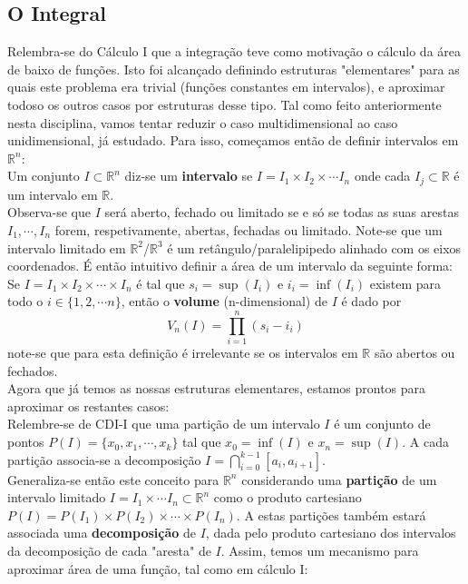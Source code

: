 \documentclass{article}
\newcommand{\R}{\mathbb{R}}
\begin{document}
\subsection{O Integral}
Relembra-se do Cálculo I que a integração teve como motivação o cálculo da área de baixo de funções. Isto foi alcançado definindo estruturas "elementares" para as quais este problema era trivial (funções constantes em intervalos), e aproximar todoso os outros casos por estruturas desse tipo. Tal como feito anteriormente nesta disciplina, vamos tentar reduzir o caso multidimensional ao caso unidimensional, já estudado. Para isso, começamos então de definir intervalos em $\R^n$:\\
Um conjunto $I \subset \R^n$ diz-se um \textbf{intervalo} se $I = I_1 \times I_2 \times \cdots I_n$ onde cada $I_j \subset \R$ é um intervalo em $\R$.\\
Observa-se que $I$ será aberto, fechado ou limitado se e só se todas as suas arestas $I_1, \cdots, I_n$ forem, respetivamente, abertas, fechadas ou limitado.
Note-se que um intervalo limitado em $\R^2$/$\R^3$ é um retângulo/paralelipipedo alinhado com os eixos coordenados. É então intuitivo definir a área de um intervalo da seguinte forma:\\
Se $I = I_1 \times I_2 \times \cdots \times I_n$ é tal que $s_i = \sup(I_i)$ e $i_i = \inf(I_i)$ existem para todo o $i \in \{1,2,\cdots n\}$, então o \textbf{volume} (n-dimensional) de $I$ é dado por
$$
V_n(I) = \prod_{i=1}^n (s_i-i_i)
$$
note-se que para esta definição é irrelevante se os intervalos em $\R$ são abertos ou fechados.\\
Agora que já temos as nossas estruturas elementares, estamos prontos para aproximar os restantes casos:\\
Relembre-se de CDI-I que uma partição de um intervalo $I$ é um conjunto de pontos $P(I) = \{ x_0, x_1, \cdots, x_k \}$ tal que $x_0 = \inf(I)$ e $x_n = \sup(I)$. A cada partição associa-se a decomposição $I = \bigcap_{i=0}^{k-1} [a_i, a_{i+1}]$.\\
Generaliza-se então este conceito para $\R^n$ considerando uma \textbf{partição} de um intervalo limitado $I = I_1 \times \cdots I_n \subset \R^n$ como o produto cartesiano $P(I) = P(I_1) \times P(I_2) \times \cdots \times P(I_n)$. A estas partições também estará associada uma \textbf{decomposição} de $I$, dada pelo produto cartesiano dos intervalos da decomposição de cada "aresta" de $I$. Assim, temos um mecanismo para aproximar área de uma função, tal como em cálculo I:\\
\end{document}
